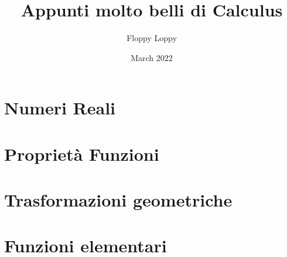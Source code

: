 \documentclass[a4paper]{article}
\theoremstyle{definition}
\begin{document}
\title{Appunti molto belli di Calculus}
\author{Floppy Loppy}
\date{March 2022}
\maketitle
\tableofcontents




\newpage
\section{Numeri Reali}\label{sec:introduzione}



\newpage
\section{Proprietà Funzioni}\label{sec:proprietà_funzioni}



\newpage
\section{Trasformazioni geometriche}\label{sec:trasformazioni_gemoetriche}



\section{Funzioni elementari}\label{sec:funzioni_elementari}

\end{document}
